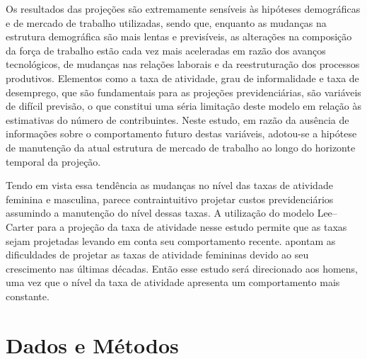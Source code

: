 \documentclass[12pt, 						%
			openright, 					%
			twoside,					%
			a4paper,x					%
			english,					%
			brazil]{abntex2}				%
\begin{document}
	\begin{citacao}
	Os resultados das projeções são extremamente sensíveis às hipóteses demográficas e de mercado de trabalho utilizadas, sendo que, enquanto as mudanças na estrutura demográfica são mais lentas e previsíveis, as alterações na composição da força de trabalho estão cada vez mais aceleradas em razão dos avanços tecnológicos, de mudanças nas relações laborais e da reestruturação dos processos produtivos. Elementos como a taxa de atividade, grau de informalidade e taxa de desemprego, que são fundamentais para as projeções previdenciárias, são variáveis de difícil previsão, o que constitui uma séria limitação deste modelo em relação às estimativas do número de contribuintes. Neste estudo, em razão da ausência de informações sobre o comportamento futuro destas variáveis, adotou-se a hipótese de manutenção da atual estrutura de mercado de trabalho ao longo do horizonte temporal da projeção.
	\end{citacao} 
	Tendo em vista essa tendência as mudanças no nível das taxas de atividade feminina e masculina, parece contraintuitivo projetar custos previdenciários assumindo a manutenção do nível dessas taxas. A utilização do modelo Lee--Carter para a projeção da taxa de atividade nesse estudo permite que as taxas sejam projetadas levando em conta seu comportamento recente.  apontam as dificuldades de projetar as taxas de atividade femininas devido ao seu crescimento nas últimas décadas. Então esse estudo será direcionado aos homens, uma vez que o nível da taxa de atividade apresenta um comportamento mais constante.
	

\chapter{Dados e Métodos \label{cap3}}
\end{document}
